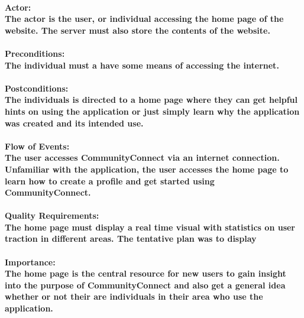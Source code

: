 \documentclass[12pt]{article}
\begin{document}
                        \paragraph{\normalfont \textbf{Actor:}\\The actor is the user, or individual accessing the home page of the website. The server must also store the contents of the website.
                        }
                        \paragraph{\normalfont \textbf{Preconditions:}\\The individual must a have some means of accessing the internet.
                        }
                        \paragraph{\normalfont \textbf{Postconditions:}\\ The individuals is directed to a home page where they can get helpful hints on using the application or just simply learn why the application was created and its intended use.
                        }
                        \paragraph{\normalfont \textbf{Flow of Events:}\\The user accesses CommunityConnect via an internet connection. Unfamiliar with the application, the user accesses the home page to learn how to create a profile and get started using CommunityConnect.
                        }
                        \paragraph{\normalfont \textbf{Quality Requirements:}\\The home page must display a real time visual with statistics on user traction in different areas. The tentative plan was to display
                        }
                        \paragraph{\normalfont \textbf{Importance:}\\The home page is the central resource for new users to gain insight into the purpose of CommunityConnect and also get a general idea whether or not their are individuals in their area who use the application.
                        }
\end{document}
